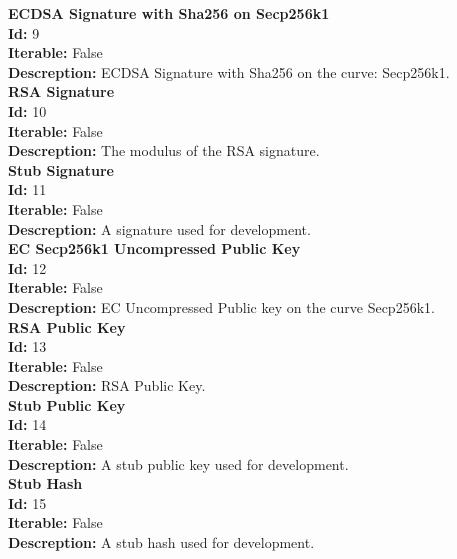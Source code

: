 \documentclass[11pt]{article}
\begin{document}
\noindent
\textbf{ECDSA Signature with Sha256 on Secp256k1} \\
\indent \textbf{Id:} 9 \\
\indent \textbf{Iterable:} False \\
\indent \textbf{Descreption:} ECDSA Signature with Sha256 on the curve: Secp256k1. \\

\noindent
\textbf{RSA Signature} \\
\indent \textbf{Id:} 10 \\
\indent \textbf{Iterable:} False \\
\indent \textbf{Descreption:} The modulus of the RSA signature. \\

\noindent
\textbf{Stub Signature} \\
\indent \textbf{Id:} 11 \\
\indent \textbf{Iterable:} False \\
\indent \textbf{Descreption:} A signature used for development. \\

\noindent
\textbf{EC Secp256k1 Uncompressed Public Key} \\
\indent \textbf{Id:} 12 \\
\indent \textbf{Iterable:} False \\
\indent \textbf{Descreption:} EC Uncompressed Public key on the curve Secp256k1. \\

\noindent
\textbf{RSA Public Key} \\
\indent \textbf{Id:} 13 \\
\indent \textbf{Iterable:} False \\
\indent \textbf{Descreption:} RSA Public Key. \\

\noindent
\textbf{Stub Public Key} \\
\indent \textbf{Id:} 14 \\
\indent \textbf{Iterable:} False \\
\indent \textbf{Descreption:} A stub public key used for development. \\

\noindent
\textbf{Stub Hash} \\
\indent \textbf{Id:} 15 \\
\indent \textbf{Iterable:} False \\
\indent \textbf{Descreption:} A stub hash used for development. \\
\end{document}
